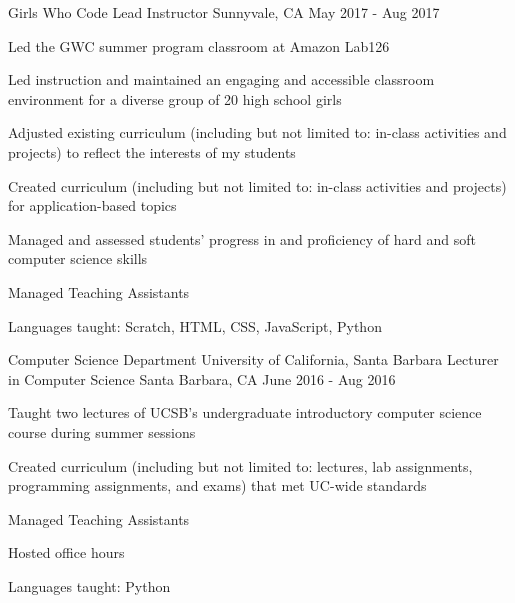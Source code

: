 \begin{cventries}
  \cventry
{Girls Who Code}
    {Lead Instructor}
    {Sunnyvale, CA}
    {May 2017 - Aug 2017}
    {
      \begin{cvitems}
	\item {Led the GWC summer program classroom at Amazon Lab126}\\
	\begin{cvitems}
        \item Led instruction and maintained an engaging and accessible classroom environment for a diverse group of 20 high school girls
         \item Adjusted existing curriculum (including but not limited to: in-class activities and projects) to reflect the interests of my students
         \item Created curriculum (including but not limited to: in-class activities and projects) for application-based topics
	\item Managed and assessed students’ progress in and proficiency of hard and soft computer science skills
	\item Managed Teaching Assistants
	\end{cvitems}
	\vspace{2mm}
	\item Languages taught: Scratch, HTML, CSS, JavaScript, Python
      \end{cvitems}
    }

  \cventry
{Computer Science Department \newline University of California, Santa Barbara}
    {Lecturer in Computer Science}
    {Santa Barbara, CA}
    {June 2016 - Aug 2016}
    {
      \begin{cvitems}
	\item {Taught two lectures of UCSB's undergraduate introductory computer science course during summer sessions}\\
	\begin{cvitems}
         \item Created curriculum (including but not limited to: lectures, lab assignments, programming assignments, and exams) that met UC-wide standards
	\item Managed Teaching Assistants
	\item Hosted office hours 
	\end{cvitems}
	\vspace{2mm}
	\item Languages taught: Python
      \end{cvitems}
    }


\end{cventries}
